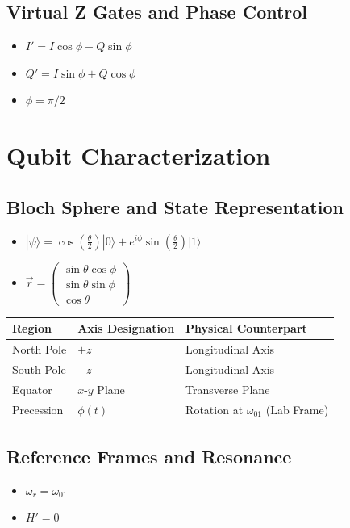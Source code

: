 \documentclass{article}
\begin{document}
\subsection*{Virtual Z Gates and Phase Control}
\begin{itemize}
    \item $I' = I \cos \phi - Q \sin \phi$
    \item $Q' = I \sin \phi + Q \cos \phi$
    \item $\phi = \pi/2$
\end{itemize}


\section{Qubit Characterization}

\subsection*{Bloch Sphere and State Representation}
\begin{itemize}
    \item $|\psi\rangle = \cos\left(\frac{\theta}{2}\right)|0\rangle + e^{i\phi}\sin\left(\frac{\theta}{2}\right)|1\rangle$
    \item $\vec{r} = \begin{pmatrix} \sin\theta\cos\phi \\ \sin\theta\sin\phi \\ \cos\theta \end{pmatrix}$
\end{itemize}

\begin{center}
\begin{tabular}{lll}
\textbf{Region} & \textbf{Axis Designation} & \textbf{Physical Counterpart} \\
\hline
North Pole & $+z$ & Longitudinal Axis \\
South Pole & $-z$ & Longitudinal Axis \\
Equator & $x$-$y$ Plane & Transverse Plane \\
Precession & $\phi(t)$ & Rotation at $\omega_{01}$ (Lab Frame)
\end{tabular}
\end{center}

\subsection*{Reference Frames and Resonance}
\begin{itemize}
    \item $\omega_r = \omega_{01}$
    \item $H' = 0$
\end{itemize}
\end{document}
